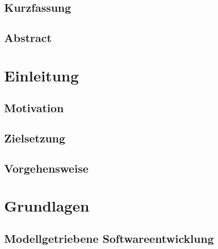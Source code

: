 \documentclass[
	oneside,  %
	ngerman, 
	final, 
	11pt, 
	a4paper, 
	1.1headlines, 
	headinclude=false, 
	footinclude=false, 
	mpinclude=false, 
	pagesize, 
	onecolumn, 
	titlepage, 
	parskip=half, 
	headsepline, 
	chapterprefix=false, 
	version=first, 
	listof=totoc, 
	bibliography=totoc, 
	toc=graduated, 
	fleqn
]{scrbook}
\begin{document}
\section*{\thispagestyle{empty}Kurzfassung}
\lipsum[1-2]

\newpage{}

\section*{\thispagestyle{empty}Abstract}		
\lipsum[1-2]

\newpage{}

\setcounter{page}{1}
\tableofcontents
		
\newpage{}
		
\setcounter{page}{1} 


	\chapter{Einleitung}
\label{chap:einleitung}


\section{Motivation}

\section{Zielsetzung}

\section{Vorgehensweise}

\chapter{Grundlagen}
\label{chap:theorie}

\section{Modellgetriebene Softwareentwicklung}
\end{document}
